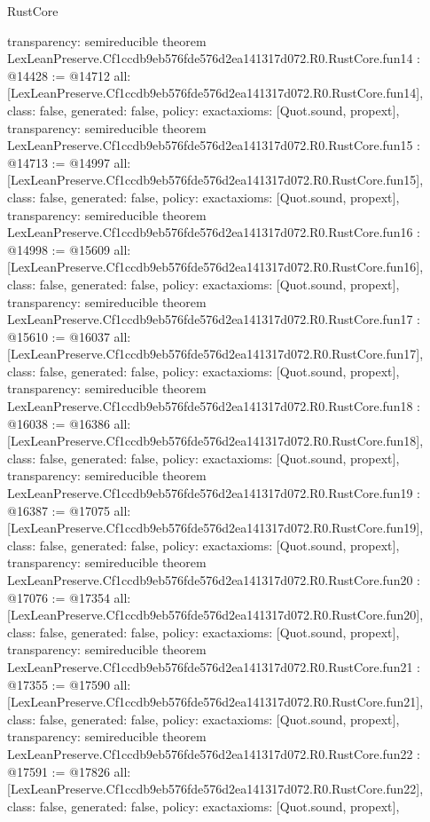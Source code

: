 \begin{lexlean}{RustCore}
\begin{coremodule}
{  transparency: semireducible
}
theorem LexLeanPreserve.Cf1ccdb9eb576fde576d2ea141317d072.R0.RustCore.fun14 : @14428 := @14712 {
  all: [LexLeanPreserve.Cf1ccdb9eb576fde576d2ea141317d072.R0.RustCore.fun14],
  class: false,
  generated: false,
  policy: exact{axioms: [Quot.sound, propext]},
  transparency: semireducible
}
theorem LexLeanPreserve.Cf1ccdb9eb576fde576d2ea141317d072.R0.RustCore.fun15 : @14713 := @14997 {
  all: [LexLeanPreserve.Cf1ccdb9eb576fde576d2ea141317d072.R0.RustCore.fun15],
  class: false,
  generated: false,
  policy: exact{axioms: [Quot.sound, propext]},
  transparency: semireducible
}
theorem LexLeanPreserve.Cf1ccdb9eb576fde576d2ea141317d072.R0.RustCore.fun16 : @14998 := @15609 {
  all: [LexLeanPreserve.Cf1ccdb9eb576fde576d2ea141317d072.R0.RustCore.fun16],
  class: false,
  generated: false,
  policy: exact{axioms: [Quot.sound, propext]},
  transparency: semireducible
}
theorem LexLeanPreserve.Cf1ccdb9eb576fde576d2ea141317d072.R0.RustCore.fun17 : @15610 := @16037 {
  all: [LexLeanPreserve.Cf1ccdb9eb576fde576d2ea141317d072.R0.RustCore.fun17],
  class: false,
  generated: false,
  policy: exact{axioms: [Quot.sound, propext]},
  transparency: semireducible
}
theorem LexLeanPreserve.Cf1ccdb9eb576fde576d2ea141317d072.R0.RustCore.fun18 : @16038 := @16386 {
  all: [LexLeanPreserve.Cf1ccdb9eb576fde576d2ea141317d072.R0.RustCore.fun18],
  class: false,
  generated: false,
  policy: exact{axioms: [Quot.sound, propext]},
  transparency: semireducible
}
theorem LexLeanPreserve.Cf1ccdb9eb576fde576d2ea141317d072.R0.RustCore.fun19 : @16387 := @17075 {
  all: [LexLeanPreserve.Cf1ccdb9eb576fde576d2ea141317d072.R0.RustCore.fun19],
  class: false,
  generated: false,
  policy: exact{axioms: [Quot.sound, propext]},
  transparency: semireducible
}
theorem LexLeanPreserve.Cf1ccdb9eb576fde576d2ea141317d072.R0.RustCore.fun20 : @17076 := @17354 {
  all: [LexLeanPreserve.Cf1ccdb9eb576fde576d2ea141317d072.R0.RustCore.fun20],
  class: false,
  generated: false,
  policy: exact{axioms: [Quot.sound, propext]},
  transparency: semireducible
}
theorem LexLeanPreserve.Cf1ccdb9eb576fde576d2ea141317d072.R0.RustCore.fun21 : @17355 := @17590 {
  all: [LexLeanPreserve.Cf1ccdb9eb576fde576d2ea141317d072.R0.RustCore.fun21],
  class: false,
  generated: false,
  policy: exact{axioms: [Quot.sound, propext]},
  transparency: semireducible
}
theorem LexLeanPreserve.Cf1ccdb9eb576fde576d2ea141317d072.R0.RustCore.fun22 : @17591 := @17826 {
  all: [LexLeanPreserve.Cf1ccdb9eb576fde576d2ea141317d072.R0.RustCore.fun22],
  class: false,
  generated: false,
  policy: exact{axioms: [Quot.sound, propext]},
}
\end{coremodule}
\end{lexlean}
